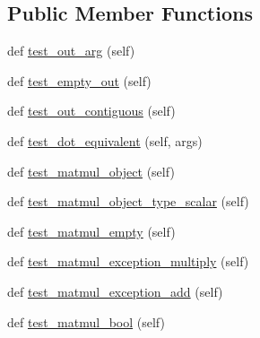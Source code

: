 \subsection*{Public Member Functions}
\begin{DoxyCompactItemize}
\item 
def \hyperlink{classnumpy_1_1core_1_1tests_1_1test__multiarray_1_1TestMatmul_a866fe50eb6500a4f659c08f2fea62ea5}{test\+\_\+out\+\_\+arg} (self)
\item 
def \hyperlink{classnumpy_1_1core_1_1tests_1_1test__multiarray_1_1TestMatmul_aeafa9db17a5110a50704169361ebc3b7}{test\+\_\+empty\+\_\+out} (self)
\item 
def \hyperlink{classnumpy_1_1core_1_1tests_1_1test__multiarray_1_1TestMatmul_a481c9b38e5149cac493ea6a0dfe31760}{test\+\_\+out\+\_\+contiguous} (self)
\item 
def \hyperlink{classnumpy_1_1core_1_1tests_1_1test__multiarray_1_1TestMatmul_aa61aa0b963630274644c0b7e650f8948}{test\+\_\+dot\+\_\+equivalent} (self, args)
\item 
def \hyperlink{classnumpy_1_1core_1_1tests_1_1test__multiarray_1_1TestMatmul_abcb8745596f7e9c64a1cc1345bd0dbf6}{test\+\_\+matmul\+\_\+object} (self)
\item 
def \hyperlink{classnumpy_1_1core_1_1tests_1_1test__multiarray_1_1TestMatmul_a24bc4772253711a9b37ba7ef72a7b29c}{test\+\_\+matmul\+\_\+object\+\_\+type\+\_\+scalar} (self)
\item 
def \hyperlink{classnumpy_1_1core_1_1tests_1_1test__multiarray_1_1TestMatmul_a677c7ba2599316e1d1419bd04592f500}{test\+\_\+matmul\+\_\+empty} (self)
\item 
def \hyperlink{classnumpy_1_1core_1_1tests_1_1test__multiarray_1_1TestMatmul_a55fae9edb5f555c69cb8d3305e49bf84}{test\+\_\+matmul\+\_\+exception\+\_\+multiply} (self)
\item 
def \hyperlink{classnumpy_1_1core_1_1tests_1_1test__multiarray_1_1TestMatmul_a1327bf0fbb19a2b6945b7624c058f038}{test\+\_\+matmul\+\_\+exception\+\_\+add} (self)
\item 
def \hyperlink{classnumpy_1_1core_1_1tests_1_1test__multiarray_1_1TestMatmul_ac7c041bce18db70c50fe66211a00ace0}{test\+\_\+matmul\+\_\+bool} (self)
\end{DoxyCompactItemize}
